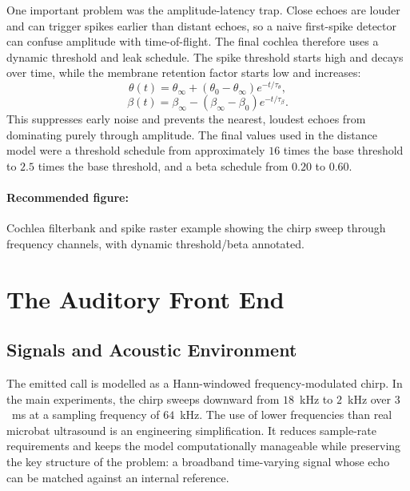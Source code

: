One important problem was the amplitude-latency trap. Close echoes are louder and can trigger spikes earlier than distant echoes, so a naive first-spike detector can confuse amplitude with time-of-flight. The final cochlea therefore uses a dynamic threshold and leak schedule. The spike threshold starts high and decays over time, while the membrane retention factor starts low and increases:
\begin{equation}
    \theta(t) = \theta_{\infty} + (\theta_0 - \theta_{\infty})e^{-t/\tau_{\theta}},
\end{equation}
\begin{equation}
    \beta(t) = \beta_{\infty} - (\beta_{\infty}-\beta_0)e^{-t/\tau_{\beta}}.
\end{equation}
This suppresses early noise and prevents the nearest, loudest echoes from dominating purely through amplitude. The final values used in the distance model were a threshold schedule from approximately $16$ times the base threshold to $2.5$ times the base threshold, and a beta schedule from $0.20$ to $0.60$.

\paragraph{Recommended figure:} Cochlea filterbank and spike raster example showing the chirp sweep through frequency channels, with dynamic threshold/beta annotated.


\section{The Auditory Front End}

\subsection{Signals and Acoustic Environment}

The emitted call is modelled as a Hann-windowed frequency-modulated chirp. In the main experiments, the chirp sweeps downward from $18$~kHz to $2$~kHz over $3$~ms at a sampling frequency of $64$~kHz. The use of lower frequencies than real microbat ultrasound is an engineering simplification. It reduces sample-rate requirements and keeps the model computationally manageable while preserving the key structure of the problem: a broadband time-varying signal whose echo can be matched against an internal reference.

